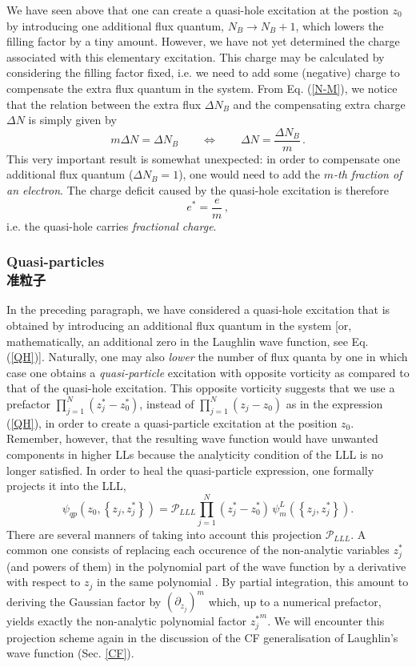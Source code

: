 \documentclass[10pt]{book}
\newcommand{\Pmath}{\mathcal{P}}
\newcommand{\beq}{\begin{equation}}
\newcommand{\eeq}{\end{equation}}
\begin{document}
We have seen above that one can create a quasi-hole excitation at the postion $z_0$ by introducing one additional flux quantum,
$N_B\to N_B+1$,
which lowers the filling factor by a tiny amount. However, we have not yet determined the charge associated with this
elementary excitation. This charge may be calculated by considering the filling factor fixed, i.e. we need to add some (negative)
charge to compensate the extra flux quantum in the system. From Eq. (\ref{N-M}), we notice that the relation between
the extra flux $\Delta N_B$ and the compensating extra charge $\Delta N$ is simply given by 
\beq\label{fracQb}
m\Delta N = \Delta N_B \qquad \Leftrightarrow \qquad \Delta N = \frac{\Delta N_B}{m}\, .
\eeq
This very important result is somewhat unexpected: in order to compensate one additional flux quantum ($\Delta N_B=1$),
one would need to add the {\sl $m$-th fraction of an electron}. The charge deficit caused by the quasi-hole excitation is 
therefore
\beq\label{fracQ}
e^* = \frac{e}{m}\, ,
\eeq
i.e. the quasi-hole carries {\sl fractional charge}. 

\subsubsection[准粒子]{Quasi-particles\\\bf 准粒子}

In the preceding 
paragraph, we have  considered a quasi-hole excitation that is obtained by introducing an additional flux quantum in the system
[or, mathematically, an additional zero in the Laughlin wave function, see Eq. (\ref{QH})]. Naturally, one may also {\sl lower} the
number of flux quanta by one in which case one obtains a {\sl quasi-particle} excitation with opposite vorticity as compared
to that of the quasi-hole excitation. This opposite vorticity suggests that we use a prefactor $\prod_{j=1}^N(z_j^* - z_0^*)$, 
instead of $\prod_{j=1}^N(z_j - z_0)$ as in the expression (\ref{QH}), in
order to create a quasi-particle excitation at the position $z_0$. Remember, however, that the resulting wave function would
have unwanted components in higher LLs because the analyticity condition of the LLL is no longer satisfied. In order to heal
the quasi-particle expression, one formally projects it into the LLL,
\beq\label{QP}
\psi_{qp}\left(z_0,\left\{z_j,z_j^*\right\}\right)=\Pmath_{LLL}\prod_{j=1}^N (z_j^* - z_0^*)\,
\psi_m^L\left(\left\{z_j,z_j^*\right\}\right).
\eeq
There are several manners of taking into account this projection $\Pmath_{LLL}$. A common one consists of replacing each
occurence of the non-analytic variables $z_j^*$ (and powers of them) in the polynomial part of the wave function by 
a derivative with respect to $z_j$ in the same polynomial \cite{jach}. By partial integration, this amount to deriving
the Gaussian factor by $(\partial_{z_j})^m$ which, up to a numerical prefactor, yields exactly the non-analytic polynomial
factor ${z_j^*}^m$. We will encounter this projection scheme again in the discussion of the CF generalisation of
Laughlin's wave function (Sec. \ref{CF}).
\end{document}
